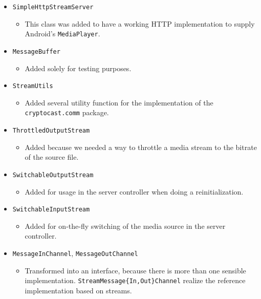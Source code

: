 \documentclass[a4paper,10pt]{scrartcl}
\begin{document}
\begin{itemize}

  \item \lstinline|SimpleHttpStreamServer|
  \begin{itemize}
   \item This class was added to have a working HTTP implementation to supply Android's
    \lstinline|MediaPlayer|.
  \end{itemize}

   \item \lstinline|MessageBuffer|
  \begin{itemize}
   \item Added solely for testing purposes.
  \end{itemize}

   \item \lstinline|StreamUtils|
  \begin{itemize}
   \item Added several utility function for the implementation of the \lstinline|cryptocast.comm| package.
  \end{itemize}

   \item \lstinline|ThrottledOutputStream|
  \begin{itemize}
   \item Added because we needed a way to throttle a media stream to the bitrate of the source file.
  \end{itemize}

  \item \lstinline|SwitchableOutputStream|
  \begin{itemize}
   \item Added for usage in the server controller when doing a reinitialization.
  \end{itemize}

  \item \lstinline|SwitchableInputStream|
  \begin{itemize}
   \item Added for on-the-fly switching of the media source in the server controller.
  \end{itemize}

  \item \lstinline|MessageInChannel|, \lstinline|MessageOutChannel|
  \begin{itemize}
   \item Transformed into an interface, because there is more than one sensible implementation.
   \lstinline|StreamMessage{In,Out}Channel| realize the reference implementation based on streams.
  \end{itemize}


\end{itemize}
\end{document}
